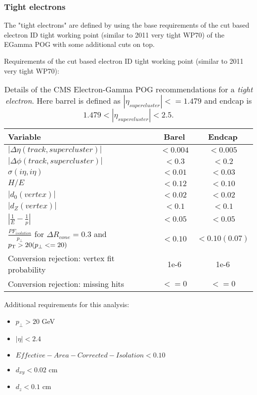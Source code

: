 \subsubsection{Tight electrons}
 
The "tight electrons" are defined by using the base requirements of the cut based electron ID tight working point (similar to 2011 very tight WP70) of the EGamma POG with some additional cuts on top.
  
Requirements of the cut based electron ID tight working point (similar to 2011 very tight WP70):

\begin{table}[htp]
  
\begin{tabular}{|l|c|c|}
\hline
Variable & Barel & Endcap \\
\hline\hline
$| \Delta\eta(track,supercluster) |$                           & $<0.004$ & $<0.005$ \\
$| \Delta\phi(track,supercluster) |$                           & $<0.3  $ & $<0.2  $ \\
$ \sigma(i\eta,i\eta)$                                         & $<0.01 $ & $<0.03 $ \\
$H/E$                                                          & $<0.12 $ & $<0.10 $ \\
$|d_{0}(vertex)|$                                              & $<0.02 $ & $<0.02 $ \\
$|d_{Z}(vertex)|$                                              & $<0.1  $ & $<0.1  $ \\
$|\frac{1}{E}-\frac{1}{p}| $                                   & $<0.05 $ & $<0.05 $ \\
$\frac{PF_{isolation}}{p_{\perp}}$ for $ \Delta R_{cone}=0.3$ and $p_{\mathrm{T}} > 20 (p_{\perp} <= 20) $ & $<0.10 $ & $<0.10(0.07)$ \\
Conversion rejection: vertex fit probability                   & 1e-6 & 1e-6 \\
Conversion rejection: missing hits                             & $<=0$ & $<=0$ \\
\hline
\end{tabular}
\caption{Details of the \gls{CMS} Electron-Gamma \gls{POG} recommendations for a \textit{tight electron}. Here barrel is defined as $ |\eta_{supercluster}|<=1.479 $ and endcap is $ 1.479 < |\eta_{supercluster}| < 2.5 $.} 
\end{table}

Additional requirements for this analysis:
\begin{itemize}
  \item $ p_{\perp} > 20 $ GeV
  \item $ |\eta| < 2.4 $
  \item $ Effective-Area-Corrected-Isolation < 0.10 $
  \item $d_{xy}<0.02 $ cm
  \item $d_{z} < 0.1 $ cm
\end{itemize}
